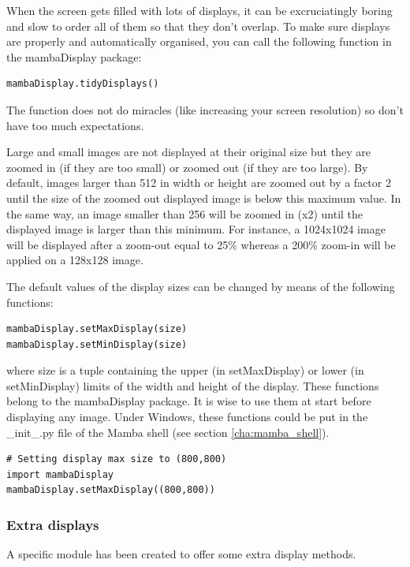 \documentclass[a4paper,10pt,oneside]{article}
\begin{document}
When the screen gets filled with lots of displays, it can be excruciatingly
boring and slow to order all of them so that they don't overlap. To make sure 
displays are properly and automatically organised, you can call the following 
function in the mambaDisplay package:

\lstset{language=Python}
\begin{lstlisting}
mambaDisplay.tidyDisplays()
\end{lstlisting}

The function does not do miracles (like increasing your screen resolution) so
don't have too much expectations.

Large and small images are not displayed at their original size but they are
zoomed in (if they are too small) or zoomed out (if they are too large). By
default, images larger than 512 in width or height are zoomed out by a factor 2
until the size of the zoomed out displayed image is below this maximum value.
In the same way, an image smaller than 256 will be zoomed in (x2) until
the displayed image is larger than this minimum. For instance, a 1024x1024 image
will be displayed after a zoom-out equal to 25\% whereas a 200\% zoom-in will be
applied on a 128x128 image.

The default values of the display sizes can be changed by means of the following
functions:

\lstset{language=Python}
\begin{lstlisting}
mambaDisplay.setMaxDisplay(size)
mambaDisplay.setMinDisplay(size)
\end{lstlisting}

where size is a tuple containing the upper (in setMaxDisplay) or lower (in
setMinDisplay) limits of the width and height of the display.
These functions belong to the mambaDisplay package. It is wise to use them at
start before displaying any image. Under Windows, these functions could be put
in the \_init\_.py file of the Mamba shell (see section \ref{cha:mamba_shell}).

\lstset{language=Python}
\begin{lstlisting}
# Setting display max size to (800,800)
import mambaDisplay
mambaDisplay.setMaxDisplay((800,800))
\end{lstlisting}

\subsubsection{Extra displays}

A specific module has been created to offer some extra display methods.
\end{document}
